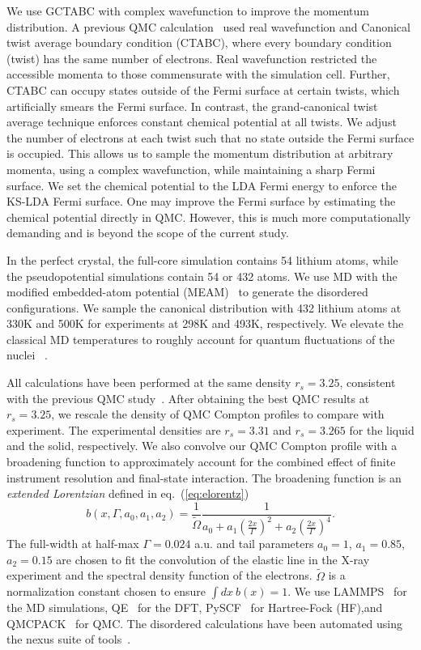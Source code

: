 \documentclass[aps,prb,showpacs,preprintnumbers,amsmath,amssymb,superscriptaddress,twocolumn]{revtex4-1}
\begin{document}
We use GCTABC with complex wavefunction to improve the momentum distribution. A previous QMC calculation~\cite{Filippi1999} used real wavefunction and Canonical twist average boundary condition (CTABC), where every boundary condition (twist) has the same number of electrons. Real wavefunction restricted the accessible momenta to those commensurate with the simulation cell. Further, CTABC can occupy states outside of the Fermi surface at certain twists, which artificially smears the Fermi surface. In contrast, the grand-canonical twist average technique enforces constant chemical potential at all twists. We adjust the number of electrons at each twist such that no state outside the Fermi surface is occupied. This allows us to sample the momentum distribution at arbitrary momenta, using a complex wavefunction, while maintaining a sharp Fermi surface. We set the chemical potential to the LDA Fermi energy to enforce the KS-LDA Fermi surface. One may improve the Fermi surface by estimating the chemical potential directly in QMC. However, this is much more computationally demanding and is beyond the scope of the current study.

In the perfect crystal, the full-core simulation contains 54 lithium atoms, while the pseudopotential simulations contain 54 or 432 atoms. We use MD with the modified embedded-atom potential (MEAM)~\cite{Baskes1992} to generate the disordered configurations. We sample the canonical distribution with 432 lithium atoms at 330K and 500K for experiments at 298K and 493K, respectively. We elevate the classical MD temperatures to roughly account for quantum fluctuations of the nuclei ~\cite{Filippi1998}.

All calculations have been performed at the same density $r_s=3.25$, consistent with the previous QMC study~\cite{Filippi1999}. After obtaining the best QMC results at $r_s=3.25$, we rescale the density of QMC Compton profiles to compare with experiment. The experimental densities are $r_s=3.31$ and $r_s=3.265$ for the liquid and the solid, respectively. We also convolve our QMC Compton profile with a broadening function to approximately account for the combined effect of finite instrument resolution and final-state interaction. The broadening function is an \emph{extended Lorentzian} defined in eq.~(\ref{eq:elorentz})
\begin{equation}
b(x,\Gamma,a_0,a_1, a_2) = \frac{1}{\tilde{\Omega}} \frac{1}{
a_0+a_1(\frac{2x}{\Gamma})^2+a_2(\frac{2x}{\Gamma})^4
}.\label{eq:elorentz}
\end{equation}
The full-width at half-max $\Gamma=0.024$ a.u. and tail parameters $a_0=1$, $a_1=0.85$, $a_2=0.15$ are chosen to fit the convolution of the elastic line in the X-ray experiment and the spectral density function of the electrons. $\tilde{\Omega}$ is a normalization constant chosen to ensure $\int dx ~b(x)=1$. We use LAMMPS~\cite{Plimpton1993} for the MD simulations, QE~\cite{Giannozzi2009,Enkovaara2017} for the DFT, PySCF~\cite{PYSCF} for Hartree-Fock (HF),and QMCPACK~\cite{Kim2018} for QMC. The disordered calculations have been automated using the nexus suite of tools~\cite{Krogel2016}.
\end{document}
